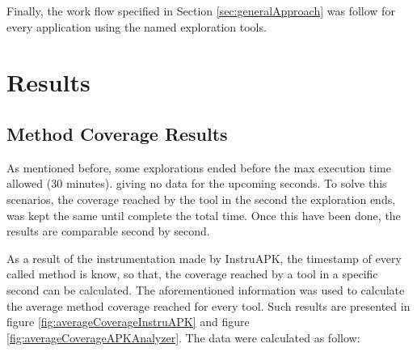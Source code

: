 \begin{table}[t]
	\centering
	\caption{Applications used for the study}
	\label{tab:apps}
\end{table}

Finally, the work flow specified in Section \ref{sec:generalApproach} was follow for every application using the named exploration tools. 

\section{Results}\label{sec:results}

\subsection{Method Coverage Results}\label{sec:coverageResults}

As mentioned before, some explorations ended before the max execution time allowed (30 minutes). giving no data for the upcoming seconds. To solve this scenarios, the coverage reached by the tool in the second the exploration ends, was kept the same until complete the total time. Once this have been done, the results are comparable second by second.


As a result of the instrumentation made by InstruAPK, the timestamp of every called method is know, so that, the coverage reached by a tool in a specific second can be calculated. The aforementioned information was used to calculate the average method coverage reached for every tool. Such results are presented in figure \ref{fig:averageCoverageInstruAPK} and figure \ref{fig:averageCoverageAPKAnalyzer}. The data were calculated as follow: 

